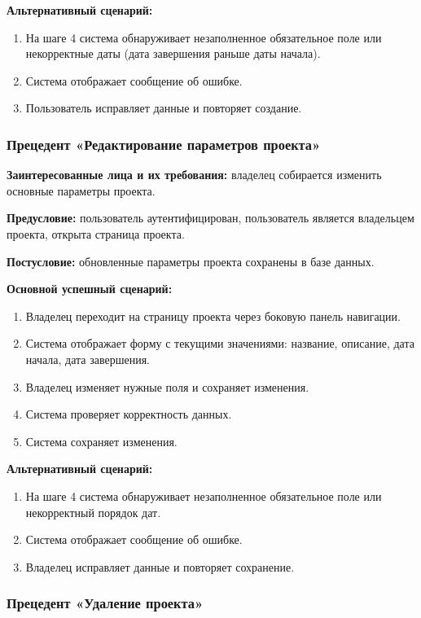 \textbf{Альтернативный сценарий:}
\begin{enumerate}
    \item На шаге 4 система обнаруживает незаполненное обязательное поле или некорректные даты (дата завершения раньше даты начала).
    \item Система отображает сообщение об ошибке.
    \item Пользователь исправляет данные и повторяет создание.
\end{enumerate}

\subsubsection{Прецедент «Редактирование параметров проекта»}

\textbf{Заинтересованные лица и их требования:} владелец собирается изменить основные параметры проекта.

\textbf{Предусловие:} пользователь аутентифицирован, пользователь является владельцем проекта, открыта страница проекта.

\textbf{Постусловие:} обновленные параметры проекта сохранены в базе данных.

\textbf{Основной успешный сценарий:}
\begin{enumerate}
    \item Владелец переходит на страницу проекта через боковую панель навигации.
    \item Система отображает форму с текущими значениями: название, описание, дата начала, дата завершения.
    \item Владелец изменяет нужные поля и сохраняет изменения.
    \item Система проверяет корректность данных.
    \item Система сохраняет изменения.
\end{enumerate}

\textbf{Альтернативный сценарий:}
\begin{enumerate}
    \item На шаге 4 система обнаруживает незаполненное обязательное поле или некорректный порядок дат.
    \item Система отображает сообщение об ошибке.
    \item Владелец исправляет данные и повторяет сохранение.
\end{enumerate}

\subsubsection{Прецедент «Удаление проекта»}

